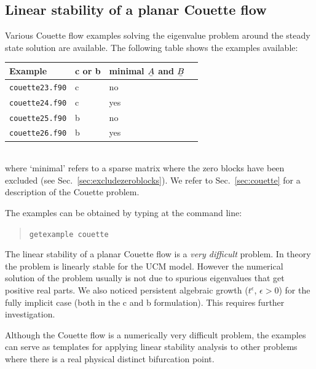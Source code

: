 \subsection{Linear stability of a planar Couette flow}
\label{sec:linearstabilityCouette}

Various Couette flow examples solving the eigenvalue problem around the steady state solution are available. 
The following table shows the examples available:\medskip\\
\begin{tabular}{llll}
Example & c or b  & minimal $\mat A$ and $\mat B$ \\\hline
 \texttt{couette23.f90} & c & no  \\
 \texttt{couette24.f90} & c & yes \\
 \texttt{couette25.f90} & b & no  \\
 \texttt{couette26.f90} & b & yes 
\end{tabular}\medskip\\
where `minimal' refers to a sparse matrix where the zero blocks have been excluded (see Sec.~\ref{sec:excludezeroblocks}). We refer to Sec.~\ref{sec:couette} for a description of the Couette problem.

The examples can be obtained by typing at the command line:
\medskip
\begin{quote}
   \texttt{getexample couette}
\end{quote}

The linear stability of a planar Couette flow is a \emph{very difficult} problem. In theory the problem is linearly stable for the UCM model. However the numerical solution of the problem usually is not due to spurious eigenvalues that get positive real parts. We also noticed persistent algebraic growth ($t^\epsilon$, $\epsilon>0$) for the fully implicit case (both in the c and b formulation). This requires further investigation.

Although the Couette flow is a numerically very difficult problem, the examples can serve as templates for applying linear stability analysis to other problems where there is a real physical distinct bifurcation point.


